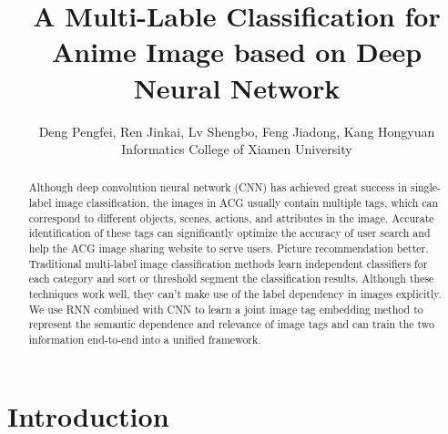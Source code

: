 \documentclass[10pt,twocolumn,letterpaper]{article}
\begin{document}

\newcommand{\figref}[1]{图\ref{#1}}
\newcommand{\tabref}[1]{表\ref{#1}}
\newcommand{\equref}[1]{式\ref{#1}}
\newcommand{\secref}[1]{第\ref{#1}节}

\renewcommand\refname{Reference}


\title{A Multi-Lable Classification for Anime Image based on Deep Neural Network}

\author{Deng Pengfei, Ren Jinkai, Lv Shengbo, Feng Jiadong, Kang Hongyuan  \\
    Informatics College of Xiamen University
}

\maketitle

\begin{abstract}
	Although deep convolution neural network (CNN) has achieved great success in single-label image classification, the images in ACG usually contain multiple tags, which can correspond to different objects, scenes, actions, and attributes in the image. Accurate identification of these tags can significantly optimize the accuracy of user search and help the ACG image sharing website to serve users. Picture recommendation better. Traditional multi-label image classification methods learn independent classifiers for each category and sort or threshold segment the classification results. Although these techniques work well, they can't make use of the label dependency in images explicitly. We use RNN combined with CNN to learn a joint image tag embedding method to represent the semantic dependence and relevance of image tags and can train the two information end-to-end into a unified framework.
\end{abstract}




\section{Introduction}\label{sec:Introduction}
\end{document}
